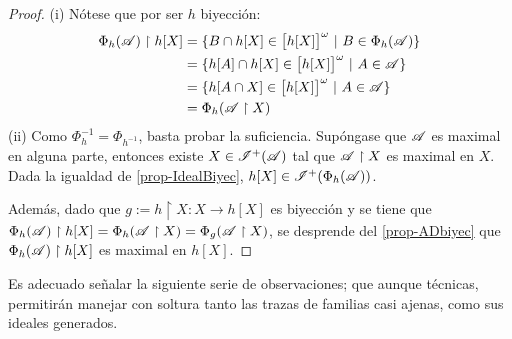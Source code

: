  \begin{proof}
  (i) Nótese que por ser $h$ biyección:
  \begin{align*}
  \Phi_h(\mathscr{A}) \upharpoonright h[X] & = \{ B \cap h[X] \in \big[ h[X] \big]^\omega \text{ $|$ } B \in \Phi_h(\mathscr{A}) \} \\
  & = \{ h[A] \cap h[X] \in \big[ h[X] \big]^\omega \text{ $|$ } A \in \mathscr{A} \} \\
  & = \{ h[A \cap X] \in \big[ h[X] \big]^\omega \text{ $|$ } A \in \mathscr{A} \} \\
  & = \Phi_h (\mathscr{A} \upharpoonright X)
  \end{align*}
  (ii) Como $\Phi_h ^{-1} = \Phi_{h^{-1}}$, basta probar la suficiencia. Supóngase que $\mathscr{A}$ es maximal en alguna parte, entonces existe $X \in \mathscr{I}^+(\mathscr{A})$ tal que $\mathscr{A} \upharpoonright X$ es maximal en $X$. Dada la igualdad de \ref{prop-IdealBiyec}, $h[X] \in \mathscr{I}^+(\Phi_h(\mathscr{A}))$.

  Además, dado que $g:= h \upharpoonright X : X \to h[X]$ es biyección y se tiene que $\Phi_h(\mathscr{A}) \upharpoonright h[X]=\Phi_h (\mathscr{A} \upharpoonright X)=\Phi_g (\mathscr{A} \upharpoonright X)$, se desprende del \autoref{prop-ADbiyec} que $\Phi_h(\mathscr{A}) \upharpoonright h[X]$ es maximal en $h[X]$.
 \end{proof}

 Es adecuado señalar la siguiente serie de observaciones; que aunque técnicas, permitirán manejar con soltura tanto las trazas de familias casi ajenas, como sus ideales generados.

